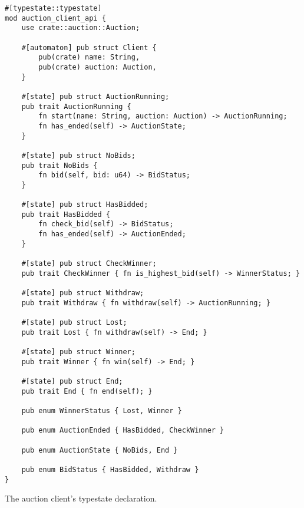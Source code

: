 \begin{listing}
    \begin{verbatim}
#[typestate::typestate]
mod auction_client_api {
    use crate::auction::Auction;

    #[automaton] pub struct Client {
        pub(crate) name: String,
        pub(crate) auction: Auction,
    }

    #[state] pub struct AuctionRunning;
    pub trait AuctionRunning {
        fn start(name: String, auction: Auction) -> AuctionRunning;
        fn has_ended(self) -> AuctionState;
    }

    #[state] pub struct NoBids;
    pub trait NoBids {
        fn bid(self, bid: u64) -> BidStatus;
    }

    #[state] pub struct HasBidded;
    pub trait HasBidded {
        fn check_bid(self) -> BidStatus;
        fn has_ended(self) -> AuctionEnded;
    }

    #[state] pub struct CheckWinner;
    pub trait CheckWinner { fn is_highest_bid(self) -> WinnerStatus; }

    #[state] pub struct Withdraw;
    pub trait Withdraw { fn withdraw(self) -> AuctionRunning; }

    #[state] pub struct Lost;
    pub trait Lost { fn withdraw(self) -> End; }

    #[state] pub struct Winner;
    pub trait Winner { fn win(self) -> End; }

    #[state] pub struct End;
    pub trait End { fn end(self); }

    pub enum WinnerStatus { Lost, Winner }

    pub enum AuctionEnded { HasBidded, CheckWinner }

    pub enum AuctionState { NoBids, End }

    pub enum BidStatus { HasBidded, Withdraw }
}
    \end{verbatim}
    \caption{The auction client's typestate declaration.}
    \label{lst:typestate-auction-client}
\end{listing}